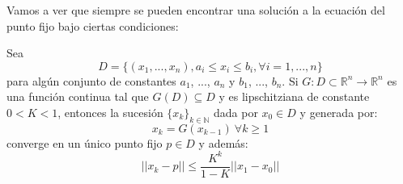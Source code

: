 


 Vamos a ver que siempre se pueden encontrar una solución a la ecuación del punto fijo bajo ciertas condiciones:

\begin{theorem}
	Sea $$D = \{(x_1,...,x_n) , a_i \leq x_i \leq b_i, \forall i = 1 ,..., n\}$$ para algún conjunto de constantes $a_1$, ..., $a_n$ y $b_1$, ..., $b_n$. Si $G : D \subset \mathbb{R}^n \longrightarrow \mathbb{R}^n$ es una función continua tal que $G(D) \subseteq D$ y es lipschitziana de constante $0<K<1$, entonces la sucesión $\{x_{k}\}_{k \in \mathbb{N}}$ dada por $x_{0} \in D$ y generada por:
	\[x_{k} = G(x_{k-1} )\ \forall k \geq 1\]
	converge en un único punto fijo $p \in D$ y además:
	\[||x_{k} - p|| \leq \frac{K^k}{1-K}||x_{1} - x_{0}|| \]
\end{theorem}


